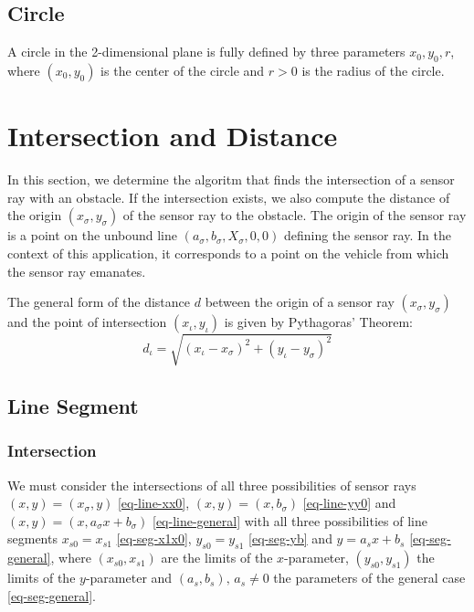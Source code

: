 \documentclass[11pt]{article}
\newcommand{\asig}{a_\sigma}
\newcommand{\bsig}{b_\sigma}
\newcommand{\diota}{d_\iota}
\newcommand{\xiota}{x_\iota}
\newcommand{\xsig}{x_\sigma}
\newcommand{\Xsig}{X_\sigma}
\newcommand{\yiota}{y_\iota}
\newcommand{\ysig}{y_\sigma}
\begin{document}
\subsection{Circle}

A circle in the 2-dimensional plane is fully defined by three parameters
$x_0, y_0, r$, where $(x_0,y_0)$ is the center of the circle and $r>0$ is the
radius of the circle.


\section{Intersection and Distance}
\label{sec-intersection-distance}

In this section, we determine the algoritm that finds the intersection of a
sensor ray  with an obstacle. If the intersection
exists, we also compute the distance of the origin $(\xsig, \ysig)$ of the
sensor ray to the obstacle. The origin of the sensor ray is a point on the
unbound line $(\asig, \bsig, \Xsig, 0, 0)$ defining the sensor ray. In the
context of this application, it corresponds to a point on the vehicle from
which the sensor ray emanates.

The general form of the distance $d$ between the origin of a sensor ray
$(\xsig,\ysig)$ and the point of intersection $(\xiota,\yiota)$ is given by
Pythagoras' Theorem:
\begin{equation}
    \diota = \sqrt{(\xiota-\xsig)^2 + (\yiota-\ysig)^2}
\end{equation}

\subsection{Line Segment}
\label{sec-intersection-line-segment}

\subsubsection*{Intersection}

We must consider the intersections of all three possibilities of sensor rays
$(x, y) =(\xsig, y)$ \eqref{eq-line-xx0}, $(x, y)=(x, \bsig)$
\eqref{eq-line-yy0} and $(x, y) = (x, \asig x+\bsig)$
\eqref{eq-line-general} with all three possibilities of line segments
$x_{s0}=x_{s1}$ \eqref{eq-seg-x1x0}, $y_{s0}=y_{s1}$ \eqref{eq-seg-yb} and
$y=a_{s}x+b_{s}$ \eqref{eq-seg-general}, where $(x_{s0}, x_{s1})$ are the
limits of the $x$-parameter, $(y_{s0}, y_{s1})$ the limits of the
$y$-parameter and $(a_{s}, b_{s}),\,a_{s}\neq 0$ the parameters of the
general case
\eqref{eq-seg-general}.
\end{document}
